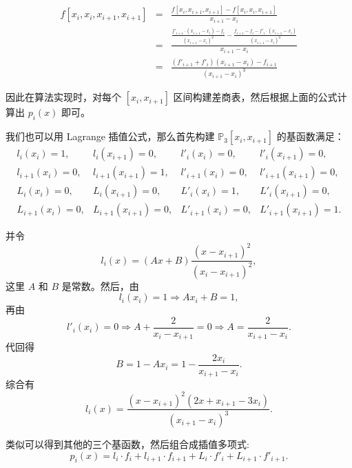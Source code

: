 \documentclass[a4paper]{ctexart}
\begin{document}
{\begin{eqnarray*}
  f[x_i, x_i, x_{i + 1}, x_{i + 1}] &=& \frac{f[x_i, x_{i + 1}, x_{i + 1}] - f[x_i, x_i, x_{i + 1}]}{x_{i + 1} - x_{i}} \\
  &=& \frac{\frac{f'_{i + 1} \cdot (x_{i + 1} - x_i) - f_i}{(x_{i + 1} - x_i)^2} - \frac{f_{i + 1} - f_i - f'_i \cdot (x_{i + 1} - x_i)}{(x_{i + 1} - x_i)^2}}{x_{i + 1} - x_{i}} \\
  &=& \frac{(f'_{i + 1} + f'_i)(x_{i + 1} - x_i) - f_{i + 1}}{(x_{i + 1} - x_i)^3}
\end{eqnarray*}

因此在算法实现时，对每个 $[x_i, x_{i + 1}]$ 区间构建差商表，然后根据上面的公式计算出 $p_i(x)$ 即可。

我们也可以用  Lagrange 插值公式，那么首先构建 $\mathbb{P}_3[x_i, x_{i + 1}]$ 的基函数满足：
$$
  \begin{array}{llll}
  l_i(x_i) = 1, &l_i(x_{i + 1}) = 0, &l'_i(x_i) = 0, &l'_i(x_{i + 1}) = 0, \\
  l_{i + 1}(x_i) = 0, &l_{i + 1}(x_{i + 1}) = 1, &l'_{i + 1}(x_i) = 0, &l'_{i + 1}(x_{i + 1}) = 0, \\
  L_i(x_i) = 0, &L_i(x_{i + 1}) = 0, &L'_i(x_i) = 1, &L'_i(x_{i + 1}) = 0, \\
  L_{i + 1}(x_i) = 0, &L_{i + 1}(x_{i + 1}) = 0, &L'_{i + 1}(x_i) = 0, &L'_{i + 1}(x_{i + 1}) = 1.  
  \end{array}
$$

并令 
$$
l_i(x) = (A x + B)\frac{(x - x_{i + 1})^2}{(x_i - x_{i + 1})^2},
$$
这里 $A$ 和 $B$ 是常数。然后，由
$$
  l_i(x_i) = 1 \Rightarrow A x_i + B = 1,
$$
再由
$$
  l'_i(x_i) = 0 \Rightarrow A + \frac{2}{x_i - x_{i + 1}} = 0 \Rightarrow A = \frac{2}{x_{i + 1} - x_i}.
$$
代回得
$$
B = 1 - A x_i = 1 - \frac{2 x_i}{x_{i + 1} - x_i}.
$$
综合有
$$
l_i(x) = \frac{(x - x_{i + 1})^2(2x + x_{i + 1} - 3x_i)}{(x_{i + 1} - x_i)^3}.
$$

类似可以得到其他的三个基函数，然后组合成插值多项式:
$$
p_i(x) = l_i\cdot f_i + l_{i + 1} \cdot f_{i + 1} + L_i \cdot f'_i + L_{i + 1} \cdot f'_{i + 1}.
$$

}
\end{document}
